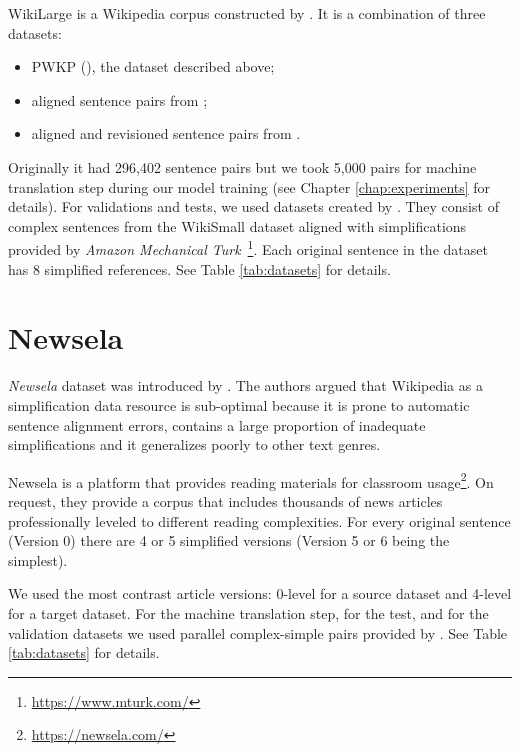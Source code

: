 WikiLarge is a Wikipedia corpus constructed by \cite{zhang-lapata-2017-sentence}. It is a combination of three datasets:

\begin{itemize}
    \item PWKP (\cite{zhu-etal-2010-monolingual}), the dataset described above;
    \item aligned sentence pairs from \cite{Kauchak2013ImprovingTS};
    \item aligned and revisioned sentence pairs from \cite{Woodsend2011LearningTS}.
\end{itemize}

Originally it had 296,402 sentence pairs but we took 5,000 pairs for machine translation step during our model training (see Chapter \ref{chap:experiments} for details). For validations and tests, we used datasets created by \cite{xu-etal-2016-optimizing}. They consist of complex sentences from the WikiSmall dataset aligned with simplifications provided by \emph{Amazon Mechanical Turk}~\footnote{\href{https://www.mturk.com/}{https://www.mturk.com/}}. Each original sentence in the dataset has 8 simplified references. See Table \ref{tab:datasets} for details.

\section{Newsela}
\label{sec:newsela-dataset}

\emph{Newsela} dataset was introduced by \cite{xu-etal-2015-problems}. The authors argued that Wikipedia as a simplification data resource is sub-optimal because it is prone to automatic sentence alignment errors, contains a large proportion of inadequate simplifications and it generalizes poorly to other text genres.

Newsela is a platform that provides reading materials for classroom usage\footnote{\href{https://newsela.com/}{https://newsela.com/}}. On request, they provide a corpus that includes thousands of news articles professionally leveled to different reading complexities. For every original sentence (Version 0) there are 4 or 5 simplified versions (Version 5 or 6 being the simplest).

We used the most contrast article versions: 0-level for a source dataset and 4-level for a target dataset. For the machine translation step, for the test, and for the validation datasets we used parallel complex-simple pairs provided by \cite{xu-etal-2015-problems}. See Table \ref{tab:datasets} for details.

